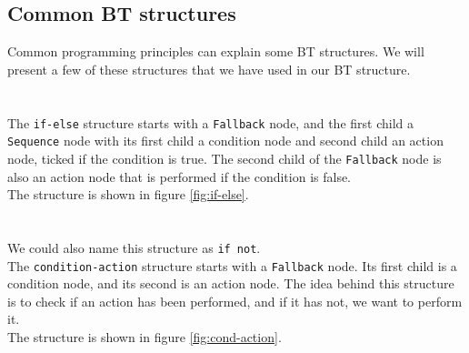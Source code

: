    \subsection{Common BT structures}
        Common programming principles can explain some BT structures. We will present a few of these structures that we have used in our BT structure.\\\\
        \\
            The \texttt{if-else} structure starts with a \texttt{Fallback} node, and the first child a \texttt{Sequence} node with its first child a condition node and second child an action node, ticked if the condition is true. The second child of the \texttt{Fallback} node is also an action node that is performed if the condition is false.\\
            The structure is shown in figure \ref{fig:if-else}.\\\\
        \\
            We could also name this structure as \texttt{if not}.\\
            The \texttt{condition-action} structure starts with a \texttt{Fallback} node. Its first child is a condition node, and its second is an action node. The idea behind this structure is to check if an action has been performed, and if it has not, we want to perform it.\\
            The structure is shown in figure \ref{fig:cond-action}.\\\\
